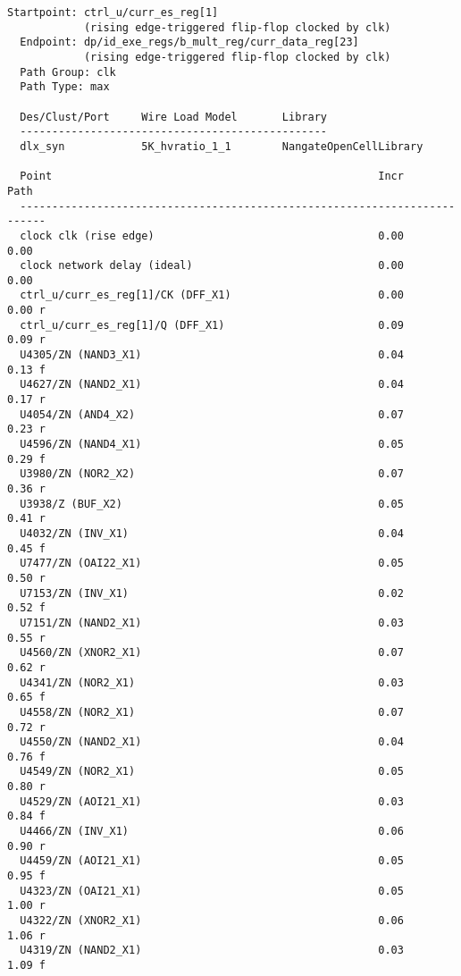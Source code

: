 \begin{verbatim}
Startpoint: ctrl_u/curr_es_reg[1]
            (rising edge-triggered flip-flop clocked by clk)
  Endpoint: dp/id_exe_regs/b_mult_reg/curr_data_reg[23]
            (rising edge-triggered flip-flop clocked by clk)
  Path Group: clk
  Path Type: max

  Des/Clust/Port     Wire Load Model       Library
  ------------------------------------------------
  dlx_syn            5K_hvratio_1_1        NangateOpenCellLibrary

  Point                                                   Incr       Path
  --------------------------------------------------------------------------
  clock clk (rise edge)                                   0.00       0.00
  clock network delay (ideal)                             0.00       0.00
  ctrl_u/curr_es_reg[1]/CK (DFF_X1)                       0.00       0.00 r
  ctrl_u/curr_es_reg[1]/Q (DFF_X1)                        0.09       0.09 r
  U4305/ZN (NAND3_X1)                                     0.04       0.13 f
  U4627/ZN (NAND2_X1)                                     0.04       0.17 r
  U4054/ZN (AND4_X2)                                      0.07       0.23 r
  U4596/ZN (NAND4_X1)                                     0.05       0.29 f
  U3980/ZN (NOR2_X2)                                      0.07       0.36 r
  U3938/Z (BUF_X2)                                        0.05       0.41 r
  U4032/ZN (INV_X1)                                       0.04       0.45 f
  U7477/ZN (OAI22_X1)                                     0.05       0.50 r
  U7153/ZN (INV_X1)                                       0.02       0.52 f
  U7151/ZN (NAND2_X1)                                     0.03       0.55 r
  U4560/ZN (XNOR2_X1)                                     0.07       0.62 r
  U4341/ZN (NOR2_X1)                                      0.03       0.65 f
  U4558/ZN (NOR2_X1)                                      0.07       0.72 r
  U4550/ZN (NAND2_X1)                                     0.04       0.76 f
  U4549/ZN (NOR2_X1)                                      0.05       0.80 r
  U4529/ZN (AOI21_X1)                                     0.03       0.84 f
  U4466/ZN (INV_X1)                                       0.06       0.90 r
  U4459/ZN (AOI21_X1)                                     0.05       0.95 f
  U4323/ZN (OAI21_X1)                                     0.05       1.00 r
  U4322/ZN (XNOR2_X1)                                     0.06       1.06 r
  U4319/ZN (NAND2_X1)                                     0.03       1.09 f

\end{verbatim}

